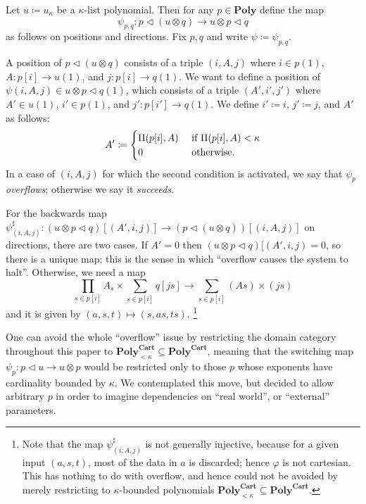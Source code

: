 \documentclass[11pt, one side, article]{memoir}
\theoremstyle{definition}
\theoremstyle{plain}
\newenvironment{definition}
  {\pushQED{\qed}\renewcommand{\qedsymbol}{$\lozenge$}\definitionx}
  {\popQED\enddefinitionx}
\renewcommand{\ss}{\subseteq}
\newcommand{\Cat}[1]{\mathbf{#1}}%
\newcommand{\tn}[1]{\textnormal{#1}}
\newcommand{\poly}{\Cat{Poly}}
\newcommand{\polycart}{\poly^{\Cat{Cart}}}
\newcommand{\0}{\textsf{0}}
\newcommand{\1}{\tn{\textsf{1}}}
\newcommand{\tri}{\mathbin{\triangleleft}}
\begin{document}
\begin{definition}[Switching map $\psi$]\label{def.switching}
Let $u\coloneqq u_\kappa$ be a $\kappa$-list polynomial. Then for any $p\in\poly$ define the map
\[\psi_{p,q}\colon p\tri (u\otimes q)\to u\otimes p\tri q\]
as follows on positions and directions. Fix $p,q$ and write $\psi\coloneqq\psi_{p,q}$.

A position of $p\tri(u\otimes q)$ consists of a triple $(i,A,j)$ where $i\in p(1)$, $A\colon p[i]\to u(1)$, and $j\colon p[i]\to q(1)$. We want to define a position of $\psi(i,A,j)\in u\otimes p\tri q(1)$, which consists of a triple $(A',i',j')$ where $A'\in u(1)$, $i'\in p(1)$, and $j'\colon p[i']\to q(1)$. We define $i'\coloneqq i$, $j'\coloneqq j$, and $A'$ as follows:
\begin{equation}\label{eqn.overflow}
  A'\coloneqq
  \begin{cases}
  	\Pi(p[i],A)&\tn{ if }\Pi(p[i],A)<\kappa\\
		0&\tn{ otherwise.}
  \end{cases}
\end{equation}
In a case of $(i,A,j)$ for which the second condition is activated, we say that $\psi_p$ \emph{overflows}; otherwise we say it \emph{succeeds}.

For the backwards map $\psi^\sharp_{(i,A,j)}\colon (u\otimes p\tri q)[(A',i,j)]\to(p\tri(u\otimes q))[(i,A,j)]$ on directions, there are two cases. If $A'=0$ then $(u\otimes p\tri q)[(A',i,j)=0$, so there is a unique map; this is the sense in which ``overflow causes the system to halt''. Otherwise, we need a map
\begin{equation}\label{eqn.not_injective}
\prod_{s\in p[i]}A_s\times\sum_{s\in p[i]}q[js]\to\sum_{s\in p[i]}(A s)\times (js)
\end{equation}
and it is given by $(a,s,t)\mapsto(s,as,ts)$.%
\footnote{Note that the map $\psi^\sharp_{(i,A,j)}$ is not generally injective, because for a given input $(a,s,t)$, most of the data in $a$ is discarded; hence $\varphi$ is not cartesian. This has nothing to do with overflow, and hence could not be avoided by merely restricting to $\kappa$-bounded polynomials $\polycart_{<\kappa}\ss\polycart$.}
\end{definition}

One can avoid the whole ``overflow'' issue by restricting the domain category throughout this paper to $\polycart_{<\kappa}\ss\polycart$, meaning that the switching map $\psi_p\colon p\tri u\to u\otimes p$ would be restricted only to those $p$ whose exponents have cardinality bounded by $\kappa$. We contemplated this move, but decided to allow arbitrary $p$ in order to imagine dependencies on ``real world'', or ``external'' parameters.
\end{document}
